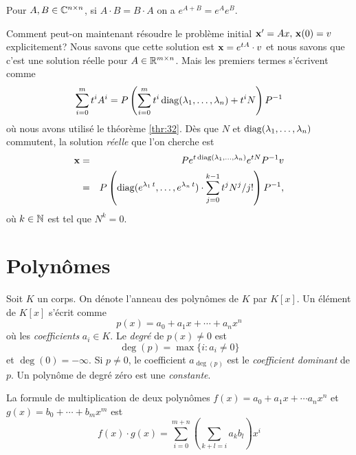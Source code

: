 \begin{lemma}
  \label{lem:18}
  Pour $A,B \in \mathbb{C}^{n \times n}$, si $A\cdot B = B \cdot A$ on a $e^{A+B} = e^A e^B$. 
\end{lemma}



Comment peut-on maintenant résoudre le problème initial $\mathbf{x}' = Ax, \, \mathbf{x}(0) = v$ explicitement? Nous savons que cette solution est $\mathbf{x} = e^{tA} \cdot v$ et nous savons que c'est une solution réelle pour $A \in \mathbb{R}^{m \times n}$. Mais les premiers termes s'écrivent comme 
\begin{displaymath}
  \sum_{i=0}^m t^i A^i = P \left(\sum_{i=0}^m t^i \operatorname{diag}(\lambda_1,\dots,\lambda_n) + t^i N \right) P^{-1} 
\end{displaymath}
où nous avons utilisé le théorème \ref{thr:32}. Dès que $N$ et $\operatorname{diag}(\lambda_1,\dots,\lambda_n)$ commutent, la solution \emph{réelle} que l'on cherche est  
\begin{eqnarray*}
  \mathbf{x} & = &  P e^{t\operatorname{diag}(\lambda_1,\dots,\lambda_n)} e^{tN} P^{-1} v \\
     & = & P \left( \operatorname{diag}(e^{\lambda_1 \, t},\dots,e^{\lambda_n \, t})\cdot  \sum_{j=0}^{k-1} t^j N^{j} / j!\right)P^{-1},
\end{eqnarray*}
où $k \in \mathbb{N}$ est tel que $N^k = 0$. 

\section{Polynômes}
\label{sec:polyn-les-lalg}

Soit $K$ un corps. 
On dénote l'anneau des polynômes de $K$ par $K[x]$. 
Un élément de $K[x]$ s'écrit comme 
\begin{displaymath}
  p(x) = a_0 + a_1 x + \cdots + a_n x^n 
\end{displaymath}
où les \emph{coefficients} $a_i \in K$. 
Le \emph{degré} de $p(x) \neq 0$ est 
\begin{displaymath}
  \deg(p) = \max\{i \colon  a_i \neq 0\}
\end{displaymath}
et $\deg(0) = -\infty$. 
Si $p \neq 0$, le coefficient $a_{\deg(p)}$ est le \emph{coefficient dominant} de $p$. 
Un polynôme de degré zéro est une \emph{constante}. 

La formule de multiplication de deux polynômes $f(x) = a_0+a_1x+ \cdots a_n x^n$ et $g(x) = b_0 + \cdots + b_m x^m$  est 
\begin{equation}
\label{eq:21}
  f(x) \cdot g(x) = \sum_{i = 0}^{m+n} \left(\sum_{k+l = i}  a_{k} b_l\right) x^i
\end{equation}

